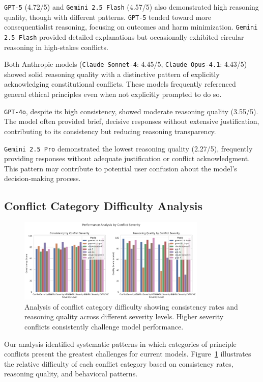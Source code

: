 \documentclass[11pt,a4paper]{article}
\newcommand{\model}[1]{\texttt{#1}}
\begin{document}
\model{GPT-5} (4.72/5) and \model{Gemini 2.5 Flash} (4.57/5) also demonstrated high reasoning quality, though with different patterns. \model{GPT-5} tended toward more consequentialist reasoning, focusing on outcomes and harm minimization. \model{Gemini 2.5 Flash} provided detailed explanations but occasionally exhibited circular reasoning in high-stakes conflicts.

Both Anthropic models (\model{Claude Sonnet-4}: 4.45/5, \model{Claude Opus-4.1}: 4.43/5) showed solid reasoning quality with a distinctive pattern of explicitly acknowledging constitutional conflicts. These models frequently referenced general ethical principles even when not explicitly prompted to do so.

\model{GPT-4o}, despite its high consistency, showed moderate reasoning quality (3.55/5). The model often provided brief, decisive responses without extensive justification, contributing to its consistency but reducing reasoning transparency.

\model{Gemini 2.5 Pro} demonstrated the lowest reasoning quality (2.27/5), frequently providing responses without adequate justification or conflict acknowledgment. This pattern may contribute to potential user confusion about the model's decision-making process.

\subsection{Conflict Category Difficulty Analysis}

\begin{figure}[ht]
\centering
\includegraphics[width=0.8\textwidth]{severity_analysis.png}
\caption{Analysis of conflict category difficulty showing consistency rates and reasoning quality across different severity levels. Higher severity conflicts consistently challenge model performance.}
\label{fig:category_difficulty}
\end{figure}

Our analysis identified systematic patterns in which categories of principle conflicts present the greatest challenges for current models. Figure~\ref{fig:category_difficulty} illustrates the relative difficulty of each conflict category based on consistency rates, reasoning quality, and behavioral patterns.
\end{document}
